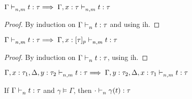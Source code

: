 \documentclass{article}
\begin{document}
\begin{lemma}
    \label{lem:coweaken1}
    $\Gamma \mathrel{\vdash_{n,m}^{} {t} : {\tau}}  \implies \Gamma, x:\tau \mathrel{\vdash_{n,m}^{} {t} : {\tau}} $\\
\end{lemma}
\begin{proof}
  By induction on $\Gamma \mathrel{\vdash_{n}^{} {t} : {\tau}}  $ and using ih.
\end{proof}

\begin{lemma}
    \label{lem:coweaken2}
    $\Gamma \mathrel{\vdash_{n,m}^{} {t} : {\tau}}  \implies \Gamma, x:[\tau]_p \mathrel{\vdash_{n,m}^{} {t} : {\tau}} $\\
\end{lemma}
\begin{proof}
  By induction on $\Gamma \mathrel{\vdash_{n}^{} {t} : {\tau}} $, using ih.
\end{proof}


\begin{lemma}
    \label{lem:coex}
    $\Gamma, x : \tau_1, \Delta, y : \tau_2 \mathrel{\vdash_{n,m}^{} {t} : {\tau}}  \implies \Gamma, y : \tau_2, \Delta, x : \tau_1 \mathrel{\vdash_{n,m}^{} {t} : {\tau}} $\\
\end{lemma}

\begin{lemma}
	\label{lem:sub}
	If $\Gamma \mathrel{\vdash_{n}^{} {t} : {\tau}}$ and $\gamma \vDash \Gamma$, then $ \cdot \mathrel{\vdash_{n}^{} {\gamma(t)} : {\tau}} $\\
\end{lemma}
\end{document}

